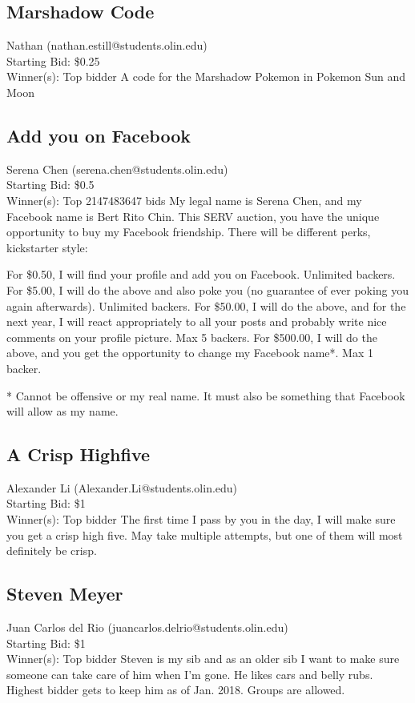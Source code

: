 \documentclass[11pt]{article}
\begin{document}
\subsection{Marshadow Code}
Nathan (nathan.estill@students.olin.edu) \\
Starting Bid: \$0.25 \\
Winner(s): 
Top bidder\newline
A code for the Marshadow Pokemon in Pokemon Sun and Moon
\subsection{Add you on Facebook}
Serena Chen (serena.chen@students.olin.edu) \\
Starting Bid: \$0.5 \\
Winner(s): 
Top 2147483647 bids\newline
My legal name is Serena Chen, and my Facebook name is Bert Rito Chin. This SERV auction, you have the unique opportunity to buy my Facebook friendship. There will be different perks, kickstarter style:

For \$0.50, I will find your profile and add you on Facebook. Unlimited backers.
For \$5.00, I will do the above and also poke you (no guarantee of ever poking you again afterwards). Unlimited backers.
For \$50.00, I will do the above, and for the next year, I will react appropriately to all your posts and probably write nice comments on your profile picture. Max 5 backers.
For \$500.00, I will do the above, and you get the opportunity to change my Facebook name*. Max 1 backer.

* Cannot be offensive or my real name. It must also be something that Facebook will allow as my name.
\subsection{A Crisp Highfive}
Alexander Li (Alexander.Li@students.olin.edu) \\
Starting Bid: \$1 \\
Winner(s): 
Top bidder\newline
The first time I pass by you in the day, I will make sure you get a crisp high five. May take multiple attempts, but one of them will most definitely be crisp.
\subsection{Steven Meyer}
Juan Carlos del Rio (juancarlos.delrio@students.olin.edu) \\
Starting Bid: \$1 \\
Winner(s): 
Top bidder\newline
Steven is my sib and as an older sib I want to make sure someone can take care of him when I'm gone. He likes cars and belly rubs. Highest bidder gets to keep him as of Jan. 2018. Groups are allowed.
\end{document}
